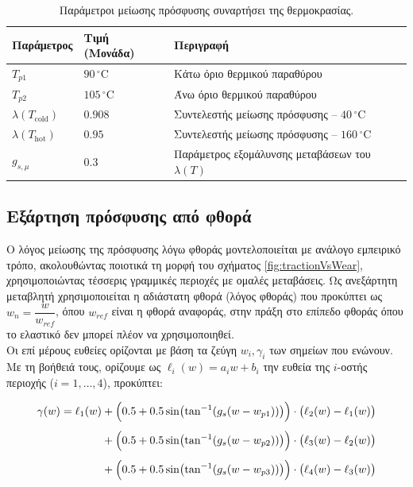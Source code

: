 \begin{table}[htbp]
    \centering
    \small
    \renewcommand{\arraystretch}{1.2}
    \begin{tabular}{@{}l l l@{}}
        \toprule
        \textbf{Παράμετρος} & \textbf{Τιμή (Μονάδα)} & \textbf{Περιγραφή} \\
        \midrule
        $T_{p1}$              & $90\,^\circ\mathrm{C}$   & Κάτω όριο θερμικού παραθύρου \\
        $T_{p2}$              & $105\,^\circ\mathrm{C}$  & Άνω όριο θερμικού παραθύρου \\
        $\lambda(T_{\text{cold}})$  & $0.908$                  & Συντελεστής μείωσης πρόσφυσης -- $40\,^\circ\mathrm{C}$ \\
        $\lambda(T_{\text{hot}})$   & $0.95$                   & Συντελεστής μείωσης πρόσφυσης -- $160\,^\circ\mathrm{C}$ \\
        $g_{s,\mu}$           & $0.3$                    & Παράμετρος εξομάλυνσης μεταβάσεων του $\lambda(T)$ \\
        \bottomrule
    \end{tabular}
    \caption{Παράμετροι μείωσης πρόσφυσης συναρτήσει της θερμοκρασίας.}
    \label{tab:params_tempscale}
\end{table}

\subsection{Εξάρτηση πρόσφυσης από φθορά}

Ο λόγος μείωσης της πρόσφυσης λόγω φθοράς μοντελοποιείται με ανάλογο εμπειρικό
τρόπο, ακολουθώντας ποιοτικά τη μορφή του σχήματος \ref{fig:tractionVsWear},
χρησιμοποιώντας τέσσερις γραμμικές περιοχές με ομαλές μεταβάσεις.
Ως ανεξάρτητη μεταβλητή χρησιμοποιείται η αδιάστατη φθορά (λόγος φθοράς) που προκύπτει ως $w_{n} = \dfrac{w}{w_{ref}}$, όπου $w_{ref}$ είναι η φθορά αναφοράς, στην πράξη στο επίπεδο φθοράς όπου το ελαστικό δεν μπορεί πλέον να χρησιμοποιηθεί.\\[0.5cm]

Οι επί μέρους ευθείες ορίζονται με βάση τα ζεύγη $w_i, \gamma_i$ των σημείων που ενώνουν. Με τη βοήθειά τους, ορίζουμε ως $\ell_i(w) = a_i w + b_i$ την ευθεία της $i$-οστής περιοχής
($i = 1,\dots,4$), προκύπτει:

\begin{equation}
\begin{aligned}
\gamma(w) = \ell_1(w)
   &+ \Bigl(0.5 + 0.5\sin\bigl(\tan^{-1}(g_s(w - w_{p1}))\bigr)\Bigr)
     \cdot \bigl(\ell_2(w) - \ell_1(w)\bigr) \\[4pt]
   &+ \Bigl(0.5 + 0.5\sin\bigl(\tan^{-1}(g_s(w - w_{p2}))\bigr)\Bigr)
     \cdot \bigl(\ell_3(w) - \ell_2(w)\bigr) \\[4pt]
   &+ \Bigl(0.5 + 0.5\sin\bigl(\tan^{-1}(g_s(w - w_{p3}))\bigr)\Bigr)
     \cdot \bigl(\ell_4(w) - \ell_3(w)\bigr)
\end{aligned}
\label{eq:wearScaleFactor}
\end{equation}

